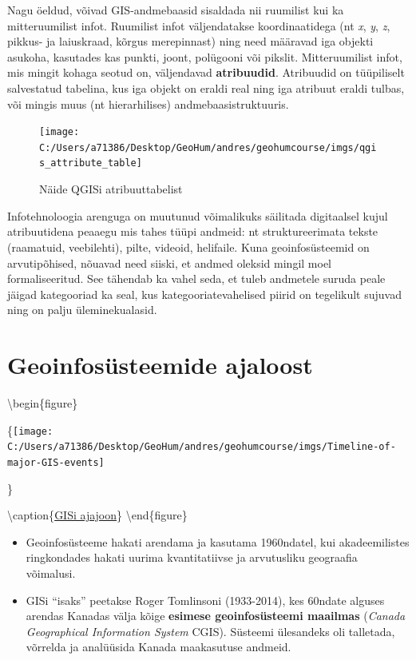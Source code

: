 \documentclass[
]{book}
\providecommand{\tightlist}{%
  \setlength{\itemsep}{0pt}\setlength{\parskip}{0pt}}
\begin{document}
Nagu öeldud, võivad GIS-andmebaasid sisaldada nii ruumilist kui ka mitteruumilist infot. Ruumilist infot väljendatakse koordinaatidega (nt \emph{x}, \emph{y}, \emph{z}, pikkus- ja laiuskraad, kõrgus merepinnast) ning need määravad iga objekti asukoha, kasutades kas punkti, joont, polügooni või pikslit. Mitteruumilist infot, mis mingit kohaga seotud on, väljendavad \textbf{atribuudid}. Atribuudid on tüüpiliselt salvestatud tabelina, kus iga objekt on eraldi real ning iga atribuut eraldi tulbas, või mingis muus (nt hierarhilises) andmebaasistruktuuris.

\begin{figure}

{\centering \texttt{[image: C:/Users/a71386/Desktop/GeoHum/andres/geohumcourse/imgs/qgis\_attribute\_table]} 

}

\caption{Näide QGISi atribuuttabelist}\label{fig:attribute-table}
\end{figure}

Infotehnoloogia arenguga on muutunud võimalikuks säilitada digitaalsel kujul atribuutidena peaaegu mis tahes tüüpi andmeid: nt struktureerimata tekste (raamatuid, veebilehti), pilte, videoid, helifaile. Kuna geoinfosüsteemid on arvutipõhised, nõuavad need siiski, et andmed oleksid mingil moel formaliseeritud. See tähendab ka vahel seda, et tuleb andmetele suruda peale jäigad kategooriad ka seal, kus kategooriatevahelised piirid on tegelikult sujuvad ning on palju üleminekualasid.

\hypertarget{geoinfosuxfcsteemide-ajaloost}{%
\section{Geoinfosüsteemide ajaloost}\label{geoinfosuxfcsteemide-ajaloost}}

\textbackslash begin\{figure\}

\{\centering \texttt{[image: C:/Users/a71386/Desktop/GeoHum/andres/geohumcourse/imgs/Timeline-of-major-GIS-events]}

\}

\textbackslash caption\{\href{https://www.researchgate.net/figure/Timeline-of-major-GIS-events_fig1_315640751}{GISi ajajoon}\}\label{fig:ajajoon}
\textbackslash end\{figure\}

\begin{itemize}
\tightlist
\item
  Geoinfosüsteeme hakati arendama ja kasutama 1960ndatel, kui akadeemilistes ringkondades hakati uurima kvantitatiivse ja arvutusliku geograafia võimalusi.\\
\item
  GISi ``isaks'' peetakse Roger Tomlinsoni (1933-2014), kes 60ndate alguses arendas Kanadas välja kõige \textbf{esimese geoinfosüsteemi maailmas} (\emph{Canada Geographical Information System} CGIS). Süsteemi ülesandeks oli talletada, võrrelda ja analüüsida Kanada maakasutuse andmeid.
\end{itemize}
\end{document}
